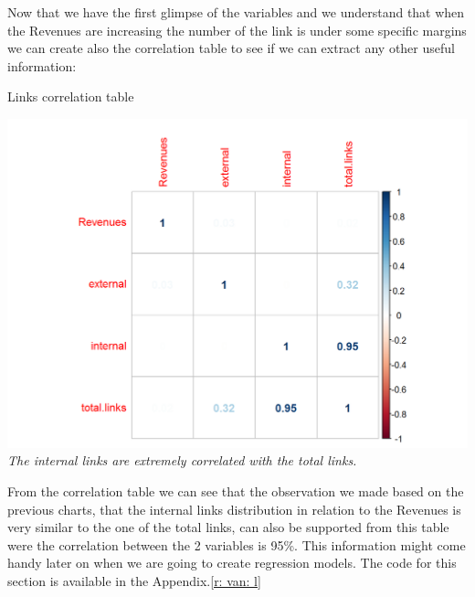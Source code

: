 \documentclass{book}
\begin{document}
Now that we have the first glimpse of the variables and we understand that when the Revenues are increasing the number of the link is under some specific margins we can create also the correlation table to see if we can extract any other useful information:

\begin{table}[H]
\centering
\caption{Links correlation table}
\begin{center}
\includegraphics[scale=0.5]{../R/photos/29_rev_cor_links.png}  \\
\textit{The internal links are extremely correlated with the total links.}
\end{center}
\end{table}
From the correlation table we can see that the observation we made based on the previous charts, that the internal links distribution in relation to the Revenues is very similar to the one of the total links, can also be supported from this table were the correlation between the 2 variables is 95\%. This information might come handy later on when we are going to create regression models. The code for this section is available in the Appendix.\ref{r: van: l}
\end{document}
